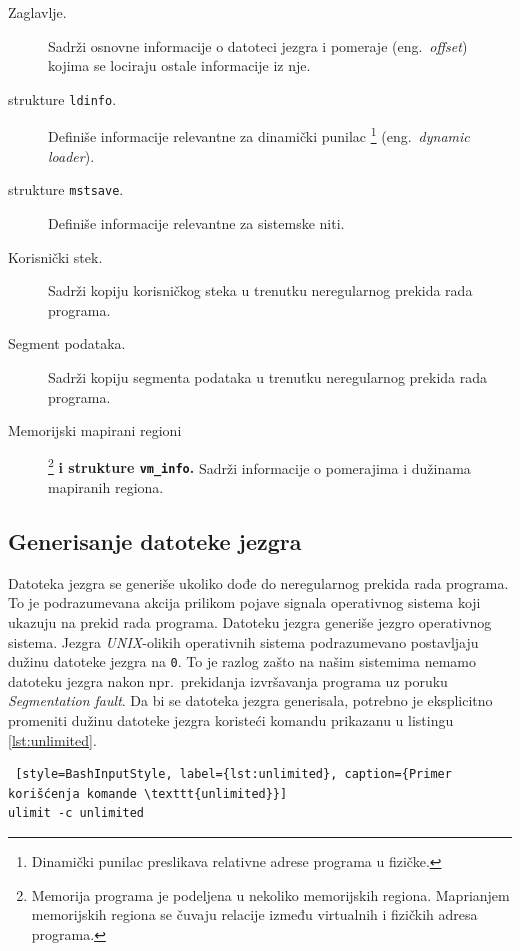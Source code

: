 \documentclass[12pt,oneside]{memoir}
\begin{document}
\begin{description}
	\item[Zaglavlje.]
	Sadrži osnovne informacije o datoteci jezgra i pomeraje (eng.~\emph{offset}) kojima se lociraju ostale informacije iz nje.
	\item[strukture \texttt{ldinfo}.]   
	Definiše informacije relevantne za dinamički punilac \footnote{Dinamički punilac preslikava relativne adrese programa u fizičke.} (eng.~\emph{dynamic loader}).
	\item[strukture \texttt{mstsave}.]
	Definiše informacije relevantne za sistemske niti.
	\item[Korisnički stek.]
	Sadrži kopiju korisničkog steka u trenutku neregularnog prekida rada programa.
	\item[Segment podataka.]   
	Sadrži kopiju segmenta podataka u trenutku neregularnog prekida rada programa.
	\item[Memorijski mapirani regioni]\footnote{Memorija programa je podeljena u nekoliko memorijskih regiona. Maprianjem memorijskih regiona se čuvaju relacije između virtualnih i fizičkih adresa programa.} \textbf{i strukture \texttt{vm\_info}.}
	Sadrži informacije o pomerajima i dužinama mapiranih regiona.
\end{description}

\subsection{Generisanje datoteke jezgra}

Datoteka jezgra se generiše ukoliko dođe do neregularnog prekida rada programa. To je podrazumevana akcija prilikom pojave signala operativnog sistema koji ukazuju na prekid rada programa. Datoteku jezgra generiše jezgro operativnog sistema. Jezgra \emph{UNIX}-olikih operativnih sistema podrazumevano postavljaju dužinu datoteke jezgra na \texttt{0}. To je razlog zašto na našim sistemima nemamo datoteku jezgra nakon npr.~prekidanja izvršavanja programa uz poruku \emph{Segmentation fault}. Da bi se datoteka jezgra generisala, potrebno je eksplicitno promeniti dužinu datoteke jezgra koristeći komandu prikazanu u listingu \ref{lst:unlimited}.

\begin{lstlisting} [style=BashInputStyle, label={lst:unlimited}, caption={Primer korišćenja komande \texttt{unlimited}}]
ulimit -c unlimited

\end{lstlisting}
\end{document}
